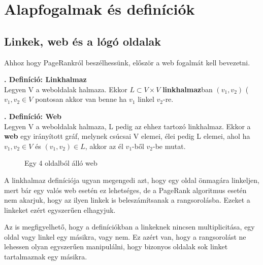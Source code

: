 \documentclass[12pt,a4paper]{article}
\newcounter{definicioszam}
\newenvironment{definicio}[1]
{{\medskip}\noindent \stepcounter{definicioszam}
{\bfseries{\thedefinicioszam. Definíció: #1\\[1ex]}}}{\bigskip }
\begin{document}
\section{Alapfogalmak és definíciók}

\subsection{Linkek, web és a lógó oldalak}\label{link_web_logooldal}

Ahhoz hogy PageRankról beszélhessünk, először a web fogalmát kell bevezetni.

\begin{definicio}{Linkhalmaz}
	Legyen V a weboldalak halmaza. Ekkor $L \subset V \times V$ \textbf{linkhalmaz}ban $(v_1,v_2)$ ($v_1, v_2 \in V$ pontosan akkor van benne ha $v_1$ linkel $v_2$-re. 
\end{definicio}

\begin{definicio}{Web}
	Legyen V a weboldalak halmaza, L pedig az ehhez tartozó linkhalmaz. Ekkor a \textbf{web} egy irányított gráf, melynek csúcsai V elemei, élei pedig L elemei, ahol ha $v_1, v_2 \in V$ és $(v_1,v_2) \in L$, akkor az él $v_1$-ből $v_2$-be mutat. 
\end{definicio}

\begin{figure}[h]
	\centering
	\caption{Egy 4 oldalból álló web}
\end{figure}

A linkhalmaz definíciója ugyan megengedi azt, hogy egy oldal önmagára linkeljen, mert bár egy valós web esetén ez lehetséges, de a PageRank algoritmus esetén nem akarjuk, hogy az ilyen linkek is beleszámítsanak a rangsorolásba. Ezeket a linkeket ezért egyszerűen elhagyjuk.

Az is megfigyelhető, hogy a definíciókban a linkeknek nincsen multiplicitása, egy oldal vagy linkel egy másikra, vagy nem. Ez azért van, hogy a rangsorolást ne lehessen olyan egyszerűen manipulálni, hogy bizonyos oldalak sok linket tartalmaznak egy másikra.  
\end{document}
